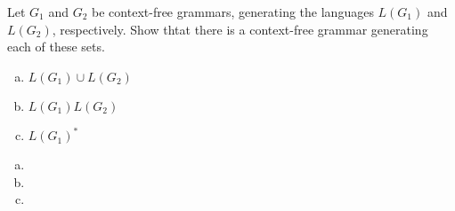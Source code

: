 \documentclass[../main.tex]{subfiles}
\begin{document}
Let $G_1$ and $G_2$ be context-free grammars,
generating the languages $L(G_1)$ and $L(G_2)$, respectively.
Show thtat there is a context-free grammar generating each of these sets.
\begin{enumerate}[a)]
	\item $L(G_1)\cup{}L(G_2)$
	\item $L(G_1)L(G_2)$
	\item $L(G_1)^\ast$
\end{enumerate}

\solution
\begin{enumerate}[a)]
	\item 
	\item 
	\item 
\end{enumerate}
\end{document}

